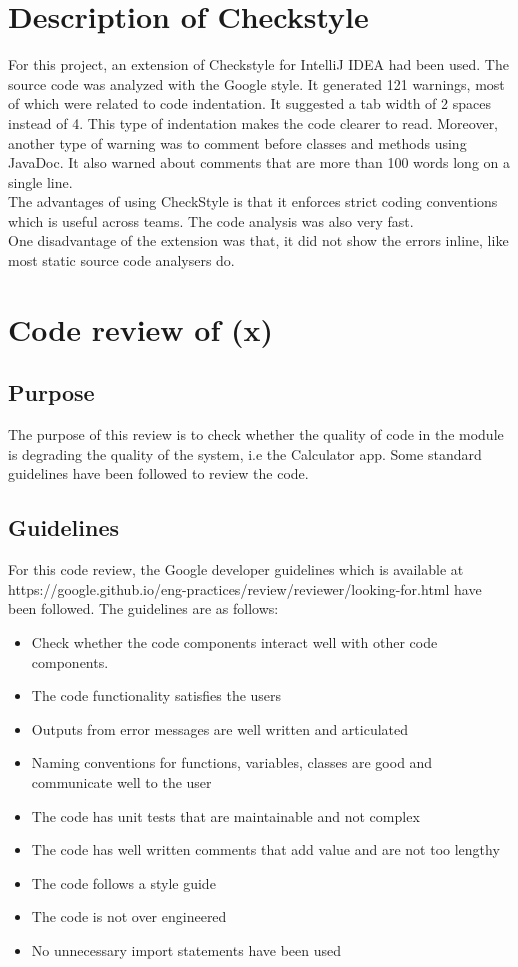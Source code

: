 \documentclass[paper=a4, fontsize=11pt,twoside]{scrartcl}	%
\begin{document}
    \section{Description of Checkstyle}
    For this project, an extension of Checkstyle for IntelliJ IDEA had been used. The source code was analyzed with the Google style. It generated 121 warnings, most of which were related to code indentation. It suggested a tab width of 2 spaces instead of 4. This type of indentation makes the code clearer to read. Moreover, another type of warning was to comment before classes and methods using JavaDoc. It also warned about comments that are more than 100 words long on a single line. \\
    The advantages of using CheckStyle is that it enforces strict coding conventions which is useful across teams. The code analysis was also very fast. \\
    One disadvantage of the extension was that, it did not show the errors inline, like most static source code analysers do.
    
    \section{Code review of \Gamma(x)}
    \subsection{Purpose}
    The purpose of this review is to check whether the quality of code in the module is degrading the quality of the system, i.e the Calculator app. Some standard guidelines have been followed to review the code. 
    \subsection{Guidelines}
    For this code review, the Google developer guidelines which is available at https://google.github.io/eng-practices/review/reviewer/looking-for.html have been followed. The guidelines are as follows:
    \begin{itemize}
        \item Check whether the code components interact well with other code components.
        \item The code functionality satisfies the users
        \item Outputs from error messages are well written and articulated
        \item Naming conventions for functions, variables, classes are good and communicate well to the user
        \item The code has unit tests that are maintainable and not complex
        \item The code has well written comments that add value and are not too lengthy
        \item The code follows a style guide
        \item The code is not over engineered
        \item No unnecessary import statements have been used
    \end{itemize}
\end{document}
